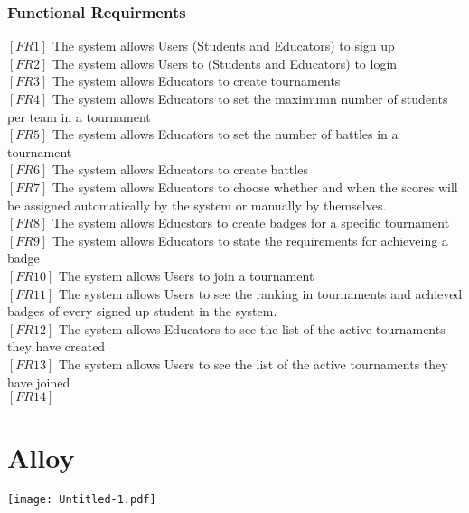 \documentclass{article}
\begin{document}
\subsubsection{Functional Requirments}
$[FR1]$ The system allows Users (Students and Educators) to sign up\\
$[FR2]$ The system allows Users to (Students and Educators) to login\\
$[FR3]$ The system allows Educators to create tournaments\\
$[FR4]$ The system allows Educators to set the maximumn number of students per team in a tournament\\
$[FR5]$ The system allows Educators to set the number of battles in a tournament\\
$[FR6]$ The system allows Educators to create battles\\
$[FR7]$ The system allows Educators to choose whether and when the scores will be assigned automatically by the system or manually by themselves.\\
$[FR8]$ The system allows Educstors to create badges for a specific tournament\\
$[FR9]$ The system allows Educators to state the requirements for achieveing a badge\\
$[FR10]$ The system allows Users to join a tournament\\
$[FR11]$ The system allows Users to see the ranking in tournaments and achieved badges of every signed up student in the system.\\
$[FR12]$ The system allows Educators to see the list of the active tournaments they have created\\
$[FR13]$ The system allows Users to see the list of the active tournaments they have joined\\
$[FR14]$ 

\newpage

\section{Alloy}
\texttt{[image: Untitled-1.pdf]}
\end{document}
